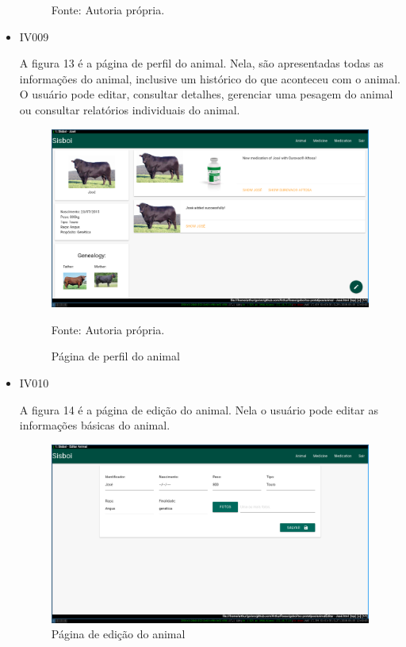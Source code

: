 \begin{itemize}
\begin{figure}[H]
\begin{center}
		Fonte: Autoria própria.
	\end{center}
\end{figure}

\item IV009

A figura 13 é a página de perfil do animal. Nela, são apresentadas todas as informações do animal, inclusive um histórico do que aconteceu com o animal. O usuário pode editar, consultar detalhes, gerenciar uma pesagem do animal ou consultar relatórios individuais do animal.
\begin{figure}[H]
	\begin{center}
		\caption{Página de perfil do animal}
		\includegraphics[width=\textwidth]{../img/prototipos/perfil.png}

		Fonte: Autoria própria.
	\end{center}
\end{figure}


\item IV010

A figura 14 é a página de edição do animal. Nela o usuário pode editar as informações básicas do animal.
\begin{figure}[]
	\begin{center}
		\caption{Página de edição do animal}
		\includegraphics[width=\textwidth]{../img/prototipos/editar.png}


\end{center}
\end{figure}
\end{itemize}
